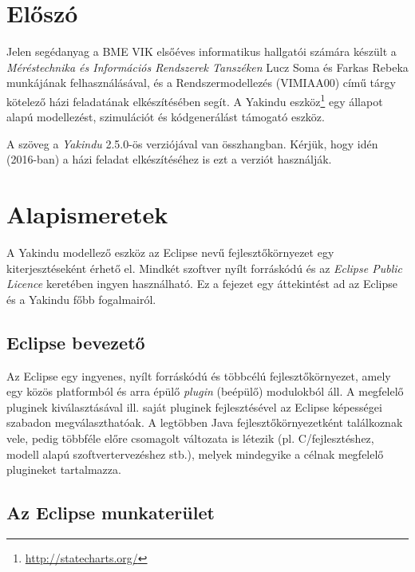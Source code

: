
\graphicspath{ {./hf/figures/} }

\section{Előszó}

Jelen segédanyag a BME VIK elsőéves informatikus hallgatói számára készült a \emph{Méréstechnika és Információs Rendszerek Tanszéken} Lucz Soma és Farkas Rebeka munkájának felhasználásával, és a Rendszermodellezés (VIMIAA00) című tárgy kötelező házi feladatának elkészítésében segít. A Yakindu eszköz\footnote{\url{http://statecharts.org/}} egy állapot alapú modellezést, szimulációt és kódgenerálást támogató eszköz.

\begin{figyelmeztetes}
A szöveg a \emph{Yakindu} 2.5.0-ös verziójával van összhangban. Kérjük, hogy idén (2016-ban) a házi feladat elkészítéséhez is ezt a verziót használják.
\end{figyelmeztetes}

\section{Alapismeretek}

A Yakindu modellező eszköz az Eclipse nevű fejlesztőkörnyezet egy kiterjesztéseként érhető el. Mindkét szoftver nyílt forráskódú és az \emph{Eclipse Public Licence} keretében ingyen használható. Ez a fejezet egy áttekintést ad az Eclipse és a Yakindu főbb fogalmairól.

\subsection{Eclipse bevezető}

Az Eclipse egy ingyenes, nyílt forráskódú és többcélú fejlesztőkörnyezet, amely egy közös platformból és arra épülő \emph{plugin} (beépülő) modulokból áll. A megfelelő pluginek kiválasztásával ill. saját pluginek fejlesztésével az Eclipse képességei szabadon megválaszthatóak. A legtöbben Java fejlesztőkörnyezetként találkoznak vele, pedig többféle előre csomagolt változata is létezik (pl. C/\cpp fejlesztéshez, modell alapú szoftvertervezéshez stb.), melyek mindegyike a célnak megfelelő plugineket tartalmazza.

\subsection{Az Eclipse munkaterület}

